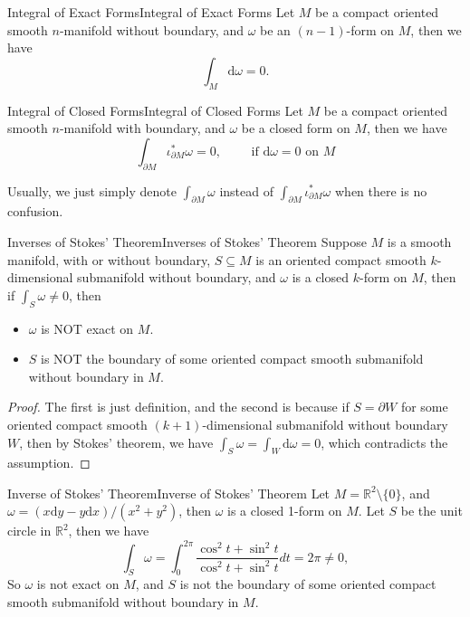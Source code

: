 \documentclass[../main.tex]{subfiles}
\begin{document}
\begin{proposition}{Integral of Exact Forms}{Integral of Exact Forms}
  Let $M$ be a compact oriented smooth $n$-manifold without boundary, and $\omega$ be an $(n-1)$-form on $M$, then we have
  \begin{equation}
    \int_M \mathrm{d} \omega = 0.
  \end{equation}
\end{proposition}
\begin{proposition}{Integral of Closed Forms}{Integral of Closed Forms}
  Let $M$ be a compact oriented smooth $n$-manifold with boundary, and $\omega$ be a closed form on $M$, then we have
  \begin{equation}
    \int_{\partial M} \iota^*_{\partial M} \omega = 0, \qquad \text{ if } \mathrm{d} \omega = 0 \text{ on } M
  \end{equation}
\end{proposition}

Usually, we just simply denote $\displaystyle \int_{\partial M} \omega$ instead of $\displaystyle \int_{\partial M} \iota^*_{\partial M} \omega$ when there is no confusion.

\begin{corollary}{Inverses of Stokes' Theorem}{Inverses of Stokes' Theorem}
  Suppose $M$ is a smooth manifold, with or without boundary, $S \subseteq M$ is an oriented compact smooth $k$-dimensional submanifold without boundary, and $\omega$ is a closed $k$-form on $M$, then if $\int_S \omega \neq 0$, then
  \begin{itemize}
    \item $\omega$ is NOT exact on $M$.
    \item $S$ is NOT the boundary of some oriented compact smooth submanifold without boundary in $M$.
  \end{itemize}
\end{corollary}
\begin{proof}
  The first is just definition, and the second is because if $S = \partial W$ for some oriented compact smooth $(k+1)$-dimensional submanifold without boundary $W$, then by Stokes' theorem, we have $\int_S \omega = \int_W \mathrm{d} \omega = 0$, which contradicts the assumption.
\end{proof}

\begin{example}{Inverse of Stokes' Theorem}{Inverse of Stokes' Theorem}
  Let $M = \mathbb{R}^2 \setminus \{0\}$, and $\omega = (x \mathrm{d} y - y \mathrm{d} x) / (x^2 + y^2)$, then $\omega$ is a closed 1-form on $M$. Let $S$ be the unit circle in $\mathbb{R}^2$, then we have
  \begin{equation*}
    \int_S \omega = \int_0^{2\pi} \frac{\cos^2 t + \sin^2 t}{\cos^2 t + \sin^2 t} dt = 2\pi \neq 0,
  \end{equation*}
  So $\omega$ is not exact on $M$, and $S$ is not the boundary of some oriented compact smooth submanifold without boundary in $M$.
\end{example}
\end{document}
